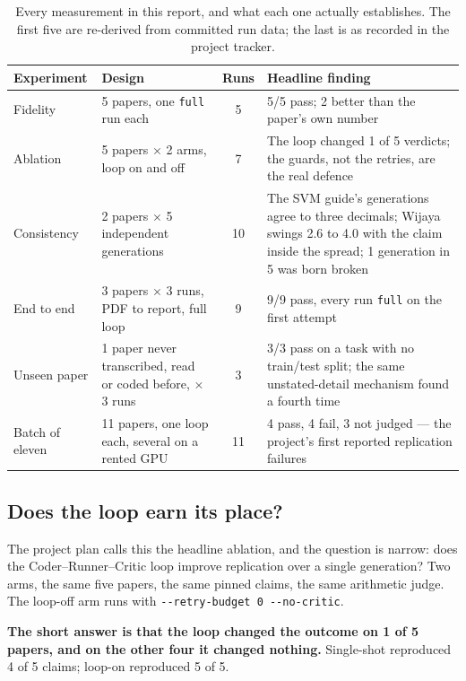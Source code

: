\documentclass[11pt]{article}
\newcommand{\squeeze}{\setlength{\tabcolsep}{4pt}}
\begin{document}
\begin{table}[tbp]
\centering
\small
\caption{Every measurement in this report, and what each one actually establishes. The first five
are re-derived from committed run data; the last is as recorded in the project tracker.}
\label{tab:experiments}
\squeeze
\begin{tabular}{L{0.14\textwidth}L{0.22\textwidth}cL{0.48\textwidth}}
\toprule
Experiment & Design & Runs & Headline finding \\
\midrule
Fidelity & 5 papers, one \texttt{full} run each & 5 & 5/5 pass; 2 better than the paper's own
  number \\
Ablation & 5 papers $\times$ 2 arms, loop on and off & 7 & The loop changed 1 of 5 verdicts; the
  guards, not the retries, are the real defence \\
Consistency & 2 papers $\times$ 5 independent generations & 10 & The SVM guide's generations agree
  to three decimals; Wijaya swings 2.6 to 4.0 with the claim inside the spread; 1 generation in 5
  was born broken \\
End to end & 3 papers $\times$ 3 runs, PDF to report, full loop & 9 & 9/9 pass, every run
  \texttt{full} on the first attempt \\
Unseen paper & 1 paper never transcribed, read or coded before, $\times$ 3 runs & 3 & 3/3 pass on
  a task with no train/test split; the same unstated-detail mechanism found a fourth time \\
Batch of eleven & 11 papers, one loop each, several on a rented GPU & 11 & 4 pass, 4 fail, 3 not
  judged --- the project's first reported replication failures \\
\bottomrule
\end{tabular}
\end{table}

\subsection{Does the loop earn its place?}

The project plan calls this the headline ablation, and the question is narrow: does the
Coder--Runner--Critic loop improve replication over a single generation? Two arms, the same five
papers, the same pinned claims, the same arithmetic judge. The loop-off arm runs with
\texttt{-{}-retry-budget 0 -{}-no-critic}.

\textbf{The short answer is that the loop changed the outcome on 1 of 5 papers, and on the other
four it changed nothing.} Single-shot reproduced 4 of 5 claims; loop-on reproduced 5 of 5.
\end{document}
